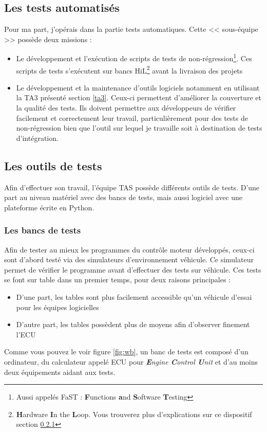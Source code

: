  		\subsection{Les tests automatisés}

 		
 		Pour ma part, j'opérais dans la partie tests automatiques. Cette << sous-équipe >> possède deux missions : 
 		\begin{itemize}
 			\item Le développement et l'exécution de scripts de tests de non-régression\footnote{Aussi appelés FaST : \textbf{F}unctions \textbf{a}nd \textbf{S}oftware \textbf{T}esting}. Ces scripts de tests s'exécutent sur bancs HiL\footnote{\textbf{H}ardware \textbf{I}n the \textbf{L}oop. Vous trouverez plus d'explications sur ce dispositif section \ref{wb}} avant la livraison des projets
 			\item Le développement et la maintenance d'outils logiciels notamment en utilisant la TA3 présenté section \ref{ta3}. Ceux-ci permettent d'améliorer la couverture et la qualité des tests. Ils doivent permettre aux développeurs de vérifier facilement et correctement leur travail, particulièrement pour des tests de non-régression bien que l'outil sur lequel je travaille soit à destination de tests d'intégration.
 		\end{itemize}
	\subsection{Les outils de tests}
	Afin d'effectuer son travail, l'équipe TAS possède différents outils de tests. D'une part au niveau matériel avec des bancs de tests, mais aussi logiciel avec une plateforme écrite en Python.
	
		\subsubsection{Les bancs de tests}\label{wb}
		Afin de tester au mieux les programmes du contrôle moteur développés, ceux-ci sont d'abord testé via des simulateurs d'environnement véhicule. Ce simulateur permet de vérifier le programme avant d'effectuer des tests sur véhicule. Ces tests se font sur table dans un premier temps, pour deux raisons principales : 
		\begin{itemize}
			\item D'une part, les tables sont plus facilement accessible qu'un véhicule d'essai pour les équipes logicielles
			\item D'autre part, les tables possèdent plus de moyens afin d'observer finement l'ECU
		\end{itemize}		
		Comme vous pouvez le voir figure \ref{fig:wb}, un banc de tests est composé d'un ordinateur, du calculateur appelé ECU pour \textit{\textbf{E}ngine \textbf{C}ontrol \textbf{U}nit} et d'au moins deux équipements aidant aux tests. 
		
